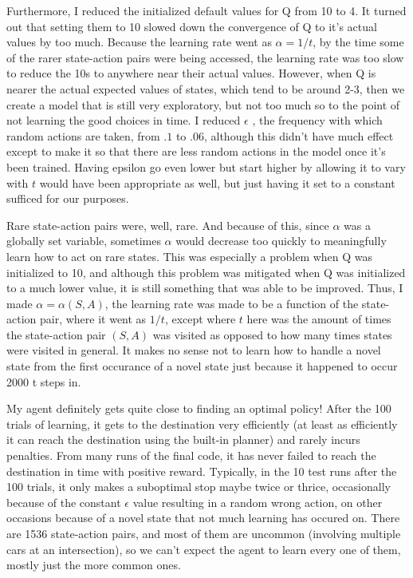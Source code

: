 \documentclass{amsart}
\begin{document}
Furthermore, I reduced the initialized default values for Q from 10 to 4.  It turned out that setting them to 10 slowed down the convergence of Q to it's actual values by too much.  Because the learning rate went as $\alpha = 1/t$, by the time some of the rarer state-action pairs were being accessed, the learning rate was too slow to reduce the 10s to anywhere near their actual values.  However, when Q is nearer the actual expected values of states, which tend to be around 2-3, then we create a model that is still very exploratory, but not too much so to the point of not learning the good choices in time.   I reduced $\epsilon$ , the frequency with which random actions are taken, from $.1$ to $.06$, although this didn't have much effect except to make it so that there are less random actions in the model once it's been trained.  Having epsilon go even lower but start higher by allowing it to vary with $t$ would have been appropriate as well, but just having it set to a constant sufficed for our purposes.

Rare state-action pairs were, well, rare.  And because of this, since $\alpha$ was a globally set variable, sometimes $\alpha$ would decrease too quickly to meaningfully learn how to act on rare states.  This was especially a problem when Q was initialized to 10, and although this problem was mitigated  when Q was initialized to a much lower value, it is still something that was able to be improved.  Thus, I made $\alpha = \alpha(S,A)$, the learning rate was made to be a function of the state-action pair, where it went as $1/t$, except where $t$ here was the amount of times the state-action pair $(S,A)$ was visited as opposed to how many times states were visited in general.  It makes no sense not to learn how to handle a novel state from the first occurance of a novel state just because it happened to occur 2000 t steps in.

My agent definitely gets quite close to finding an optimal policy!  After the 100 trials of learning, it gets to the destination very efficiently (at least as efficiently it can reach the destination using the built-in planner) and rarely incurs penalties.  From many runs of the final code, it has never failed to reach the destination in time with positive reward.  Typically, in the 10 test runs after the 100 trials, it only makes a suboptimal stop maybe twice or thrice, occasionally because of the constant $\epsilon$ value resulting in a random wrong action, on other occasions because of a novel state that not much learning has occured on.  There are 1536 state-action pairs, and most of them are uncommon (involving multiple cars at an intersection), so we can't expect the agent to learn every one of them, mostly just the more common ones.
\end{document}
